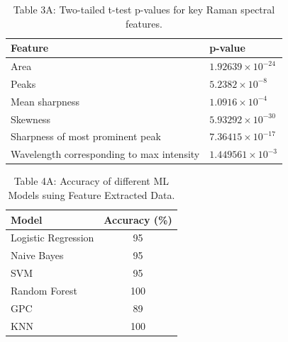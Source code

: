 \begin{table}[h]
\centering
\begin{tabular}{|l|l|}
\hline
\textbf{Feature} & \textbf{p-value} \\
\hline
Area & $1.92639 \times 10^{-24}$ \\
Peaks & $5.2382 \times 10^{-8}$ \\
Mean sharpness & $1.0916 \times 10^{-4}$ \\
Skewness & $5.93292 \times 10^{-30}$ \\
Sharpness of most prominent peak & $7.36415 \times 10^{-17}$ \\
Wavelength corresponding to max intensity & $1.449561 \times 10^{-3}$ \\
\hline
\end{tabular}
\caption*{Table 3A: Two-tailed t-test p-values for key Raman spectral features.}
\label{tab:ttest_pvalues}
\end{table}


\begin{table}[htbp]
\centering
\begin{tabular}{|l|c|}
\hline
\textbf{Model} & \textbf{Accuracy (\%)} \\
\hline
Logistic Regression & 95 \\
Naive Bayes & 95 \\
SVM & 95 \\
Random Forest & 100 \\
GPC & 89 \\
KNN & 100 \\
\hline
\end{tabular}
\caption*{Table 4A: Accuracy of different ML Models suing Feature Extracted Data.}
\label{tab:feacc}
\end{table}


